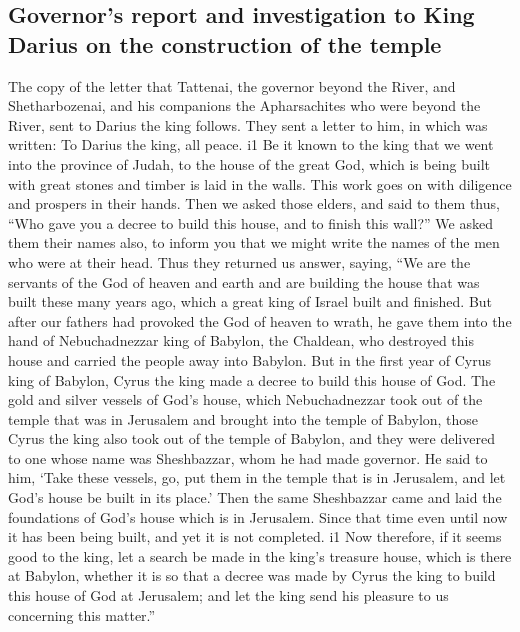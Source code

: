 \hypertarget{governors-report-and-investigation-to-king-darius-on-the-construction-of-the-temple}{%
\subsection{Governor's report and investigation to King Darius on the
construction of the
temple}\label{governors-report-and-investigation-to-king-darius-on-the-construction-of-the-temple}}

 The copy of the letter that Tattenai, the governor beyond
the River, and Shetharbozenai, and his companions the Apharsachites who
were beyond the River, sent to Darius the king follows. 
They sent a letter to him, in which was written: To Darius the king, all
peace. i1  Be it known to the king that we went into the
province of Judah, to the house of the great God, which is being built
with great stones and timber is laid in the walls. This work goes on
with diligence and prospers in their hands.  Then we asked
those elders, and said to them thus, ``Who gave you a decree to build
this house, and to finish this wall?''  We asked them
their names also, to inform you that we might write the names of the men
who were at their head.  Thus they returned us answer,
saying, ``We are the servants of the God of heaven and earth and are
building the house that was built these many years ago, which a great
king of Israel built and finished.  But after our fathers
had provoked the God of heaven to wrath, he gave them into the hand of
Nebuchadnezzar king of Babylon, the Chaldean, who destroyed this house
and carried the people away into Babylon.  But in the
first year of Cyrus king of Babylon, Cyrus the king made a decree to
build this house of God.  The gold and silver vessels of
God's house, which Nebuchadnezzar took out of the temple that was in
Jerusalem and brought into the temple of Babylon, those Cyrus the king
also took out of the temple of Babylon, and they were delivered to one
whose name was Sheshbazzar, whom he had made governor. 
He said to him, `Take these vessels, go, put them in the temple that is
in Jerusalem, and let God's house be built in its place.'
 Then the same Sheshbazzar came and laid the foundations
of God's house which is in Jerusalem. Since that time even until now it
has been being built, and yet it is not completed. i1 
Now therefore, if it seems good to the king, let a search be made in the
king's treasure house, which is there at Babylon, whether it is so that
a decree was made by Cyrus the king to build this house of God at
Jerusalem; and let the king send his pleasure to us concerning this
matter.''

